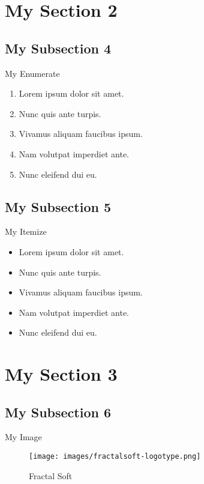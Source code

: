 \documentclass[12pt]{beamer}
\begin{document}
\section{My Section 2}
\subsection{My Subsection 4}
\begin{frame}
  \begin{block}{My Enumerate}
    \begin{enumerate}
      \item{Lorem ipsum dolor sit amet.}
      \item{Nunc quis ante turpis.}
      \item{Vivamus aliquam faucibus ipsum.}
      \item{Nam volutpat imperdiet ante.}
      \item{Nunc eleifend dui eu.}
    \end{enumerate}
  \end{block}
\end{frame}

\subsection{My Subsection 5}
\begin{frame}
  \begin{block}{My Itemize}
    \begin{itemize}
      \item{Lorem ipsum dolor sit amet.}
      \item{Nunc quis ante turpis.}
      \item{Vivamus aliquam faucibus ipsum.}
      \item{Nam volutpat imperdiet ante.}
      \item{Nunc eleifend dui eu.}
    \end{itemize}
  \end{block}
\end{frame}


\section{My Section 3}
\subsection{My Subsection 6}
\begin{frame}
  \begin{block}{My Image}
    \begin{figure}
      \centering
      \texttt{[image: images/fractalsoft-logotype.png]}
      \caption{Fractal Soft}
    \end{figure}
  \end{block}
\end{frame}
\end{document}
